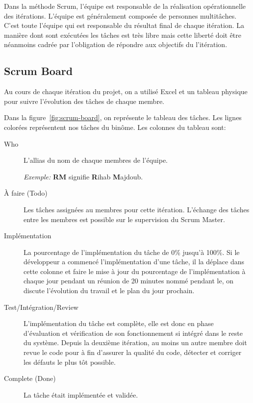 Dans la méthode Scrum, l'équipe est responsable de la réalisation
opérationnelle des itérations. L'équipe est généralement composée de personnes
multitâches. C'est toute l'équipe qui est responsable du résultat final de
chaque itération. La manière dont sont exécutées les tâches est très libre mais
cette liberté doit être néanmoins cadrée par l'obligation de répondre aux
objectifs du l'itération.

\subsection{Scrum Board}

Au cours de chaque itération du projet, on a utilisé Excel et un tableau
physique pour suivre l'évolution des tâches de chaque membre.

Dans la figure~\ref{fig:scrum-board}, on représente le tableau des tâches. Les
lignes colorées représentent nos tâches du binôme. Les colonnes du tableau
sont:

\begin{description}
    \item [Who] L'allias du nom de chaque membres de l'équipe.

        \emph{Exemple:} \textbf{RM} signifie \textbf{R}ihab \textbf{M}ajdoub.
    \item [À faire (Todo)] Les tâches assignées au membres pour cette itération.
        L'échange des tâches entre les membres est possible sur le supervision
        du Scrum Master.
    \item [Implémentation] La pourcentage de l'implémentation du tâche de 0\%
        jusqu'à 100\%. Si le développeur a commencé l'implémentation d'une
        tâche, il la déplace dans cette colonne et faire le mise à jour du
        pourcentage de l'implémentation à chaque jour pendant un réunion de 20
        minutes nommé  pendant le, on discute
        l'évolution du travail et le plan du jour prochain.
    \item [Test/Intégration/Review] L'implémentation du tâche est complète,
        elle est donc en phase d'évaluation et vérification de son
        fonctionnement si intégré dans le reste du système. Depuis la deuxième
        itération, au moins un autre membre doit revue le code pour à fin
        d'assurer la qualité du code, détecter et corriger les défauts le plus
        tôt possible.
    \item [Complete (Done)] La tâche était implémentée et validée.
\end{description}

